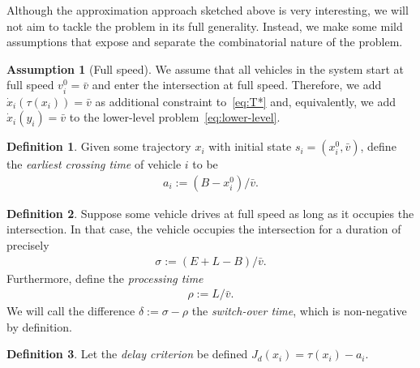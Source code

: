 \documentclass{report}
\theoremstyle{definition}
\newtheorem{define}{Definition}[chapter]
\newtheorem{assump}{Assumption}[chapter]
\theoremstyle{plain}
\begin{document}
Although the approximation approach sketched above is very interesting, we will
not aim to tackle the problem in its full generality. Instead, we make some mild
assumptions that expose and separate the combinatorial nature of the problem.

\begin{assump}[Full speed]
  We assume that all vehicles in the system start at full speed
  $v_{i}^{0} = \bar{v}$ and enter the intersection at full speed.
  Therefore, we add $\dot{x}_{i}(\tau(x_{i})) = \bar{v}$ as additional constraint
  to~\eqref{eq:T*} and, equivalently, we add $\dot{x}_{i}(y_{i}) = \bar{v}$ to the
  lower-level problem~\eqref{eq:lower-level}.
\end{assump}

\begin{define}%
  Given some trajectory $x_i$ with initial state $s_i = (x_i^0, \bar{v})$, define
  the \emph{earliest crossing time} of vehicle $i$ to be
  \begin{align}
    \label{eq:5}
    a_i := (B - x_i^0) / \bar{v} .
  \end{align}
\end{define}

\begin{define}
  Suppose some vehicle drives at full speed as long as it occupies the
  intersection. In that case, the vehicle occupies the intersection for a duration of precisely
  \begin{align}
    \sigma := (E+L-B)/\bar{v} .
  \end{align}
  Furthermore, define the \emph{processing time}
  \begin{align}
    \rho := L / \bar{v} .
  \end{align}
  We will call the difference $\delta := \sigma - \rho$ the \emph{switch-over
    time}, which is non-negative by definition.
\end{define}

\begin{define}%
  Let the \emph{delay criterion}
  be defined $J_d(x_i) = \tau(x_i) - a_i$.
\end{define}
\end{document}
